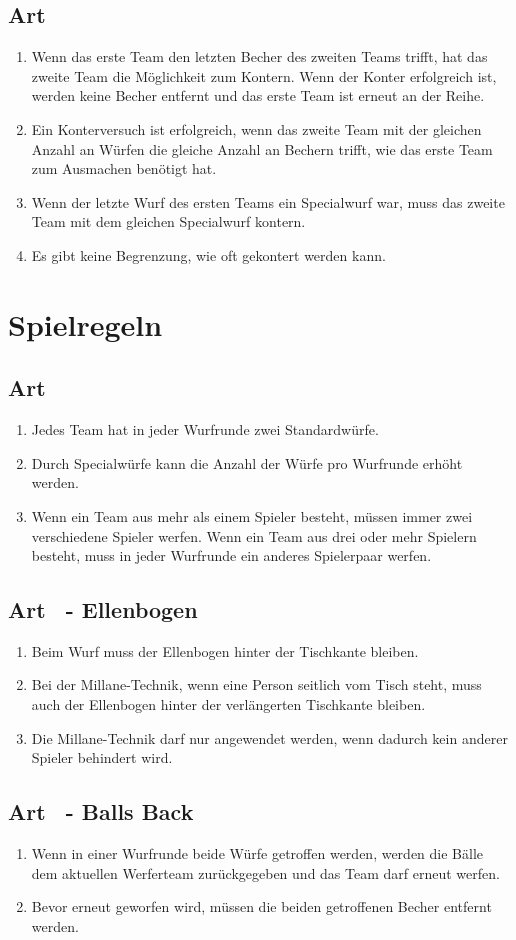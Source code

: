 \documentclass[a4paper,11pt]{scrartcl}
\newcommand{\enum}[1]{\begin{enumerate}[label=(\arabic*)]#1\end{enumerate}}
\newcommand{\art}[2]{\subsection*{#1} \enum{#2}}
\newcommand{\quot}[1]{\glqq #1\grqq}
\newcounter{art}
\begin{document}
    \art{Art \theart}{
        \item
            Wenn das erste Team den letzten Becher des zweiten Teams trifft, hat das zweite Team die Möglichkeit zum Kontern. Wenn der Konter erfolgreich ist, werden keine Becher entfernt und das erste Team ist erneut an der Reihe.
        \item
            Ein Konterversuch ist erfolgreich, wenn das zweite Team mit der gleichen Anzahl an Würfen die gleiche Anzahl an Bechern trifft, wie das erste Team zum Ausmachen benötigt hat.
        \item
            Wenn der letzte Wurf des ersten Teams ein Specialwurf war, muss das zweite Team mit dem gleichen Specialwurf kontern.
        \item
            Es gibt keine Begrenzung, wie oft gekontert werden kann.
    }

\section{Spielregeln}
    \art{Art \theart}{
        \item
            Jedes Team hat in jeder Wurfrunde zwei Standardwürfe.
        \item
            Durch Specialwürfe kann die Anzahl der Würfe pro Wurfrunde erhöht werden.
        \item
            Wenn ein Team aus mehr als einem Spieler besteht, müssen immer zwei verschiedene Spieler werfen. Wenn ein Team aus drei oder mehr Spielern besteht, muss in jeder Wurfrunde ein anderes Spielerpaar werfen.
    }

    \art{Art \theart\ - Ellenbogen}{
        \item
            Beim Wurf muss der Ellenbogen hinter der Tischkante bleiben.
        \item
            Bei der Millane-Technik, wenn eine Person seitlich vom Tisch steht, muss auch der Ellenbogen hinter der verlängerten Tischkante bleiben.
        \item
            Die Millane-Technik darf nur angewendet werden, wenn dadurch kein anderer Spieler behindert wird.
    }

    \art{Art \theart\ - \quot{Balls Back}}{
        \item
            Wenn in einer Wurfrunde beide Würfe getroffen werden, werden die Bälle dem aktuellen Werferteam zurückgegeben und das Team darf erneut werfen.
        \item
            Bevor erneut geworfen wird, müssen die beiden getroffenen Becher entfernt werden.
    }
\end{document}
